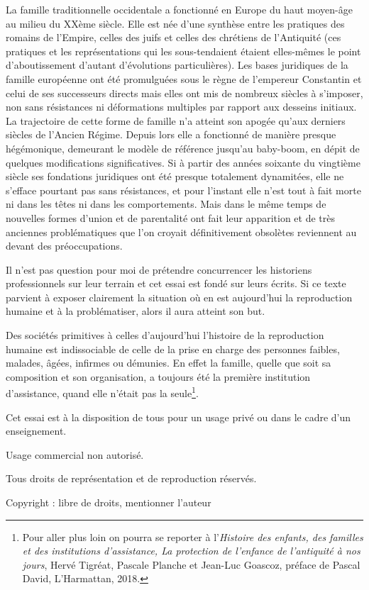 La famille traditionnelle occidentale a fonctionné en Europe du haut moyen-âge au milieu du XXème siècle. Elle est née d'une synthèse entre les pratiques des romains de l'Empire, celles des juifs et celles des chrétiens de l'Antiquité (ces pratiques et les représentations qui les sous-tendaient étaient elles-mêmes le point d'aboutissement d'autant d'évolutions particulières). Les bases juridiques de la famille européenne ont été promulguées sous le règne de l'empereur Constantin et celui de ses successeurs directs mais elles ont mis de nombreux siècles à s'imposer, non sans résistances ni déformations multiples par rapport aux desseins initiaux. La trajectoire de cette forme de famille n'a atteint son apogée qu'aux derniers siècles de l'Ancien Régime. Depuis lors elle a fonctionné de manière presque hégémonique, demeurant le modèle de référence jusqu'au baby-boom, en dépit de quelques modifications significatives. Si à partir des années soixante du vingtième siècle ses fondations juridiques ont été presque totalement dynamitées, elle ne s'efface pourtant pas sans résistances, et pour l'instant elle n'est tout à fait morte ni dans les têtes ni dans les comportements. Mais dans le même temps de nouvelles formes d'union et de parentalité ont fait leur apparition et de très anciennes problématiques que l'on croyait définitivement obsolètes reviennent au devant des préoccupations. 

Il n'est pas question pour moi de prétendre concurrencer les historiens professionnels sur leur terrain et cet essai est fondé sur leurs écrits.  Si ce texte parvient à exposer clairement la situation où en est aujourd'hui la reproduction humaine et à la problématiser, alors il aura atteint son but.  
 

Des sociétés primitives à celles d'aujourd’hui l'histoire de la reproduction humaine est indissociable de celle de la prise en charge des personnes faibles, malades, âgées, infirmes ou démunies. En effet la famille, quelle que soit sa composition et son organisation, a toujours été la première institution d'assistance, quand elle n'était pas la seule\footnote{Pour aller plus loin on pourra se reporter à l'\emph{Histoire des enfants, des familles et des institutions d'assistance, La protection de l'enfance de l'antiquité à nos jours}, Hervé Tigréat, Pascale Planche et Jean-Luc Goascoz, préface de Pascal David, L'Harmattan, 2018.}.





Cet essai est à la disposition de tous pour un usage privé ou dans le cadre d'un enseignement. 

Usage commercial non autorisé. 

Tous droits de représentation et de reproduction réservés.

Copyright : libre de droits, mentionner l'auteur







